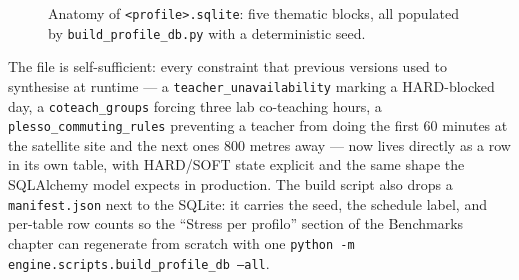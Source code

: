 \begin{figure}[h]
\centering
{}
\caption{Anatomy of \texttt{<profile>.sqlite}: five thematic
   blocks, all populated by \texttt{build\_profile\_db.py} with a
   deterministic seed.}
\label{fig:profilo_sqlite}
\end{figure}

The file is self-sufficient: every constraint that previous
versions used to synthesise at runtime --- a
\texttt{teacher\_unavailability} marking a HARD-blocked day, a
\texttt{coteach\_groups} forcing three lab co-teaching hours, a
\texttt{plesso\_commuting\_rules} preventing a teacher from doing
the first 60 minutes at the satellite site and the next ones 800
metres away --- now lives directly as a row in its own table,
with HARD/SOFT state explicit and the same shape the SQLAlchemy
model expects in production. The build script also drops a
\texttt{manifest.json} next to the SQLite: it carries the seed,
the schedule label, and per-table row counts so the ``Stress per
profilo'' section of the Benchmarks chapter can regenerate from
scratch with one
\texttt{python -m engine.scripts.build\_profile\_db --all}.

